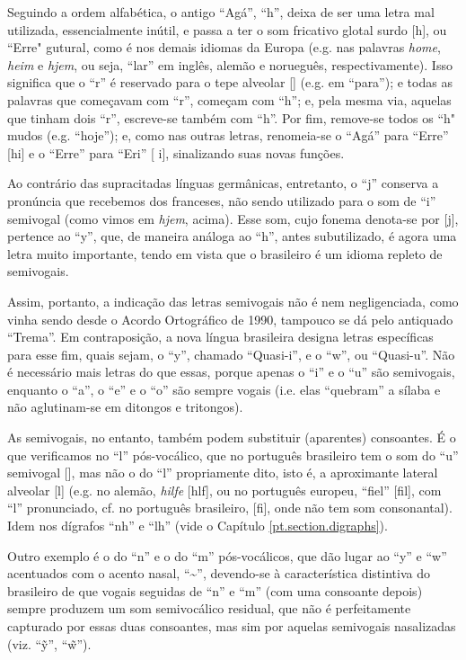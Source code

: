 \documentclass[12pt, a5paper, titlepage]{article}
\begin{document}
Seguindo a ordem alfabética, o antigo ``Agá'', ``h'', deixa de ser uma letra
mal utilizada, essencialmente inútil, e passa a ter o som fricativo glotal
surdo [h], ou ``Erre" gutural, como é nos demais idiomas da Europa (e.g. nas
palavras \textit{home}, \textit{heim} e \textit{hjem}, ou seja, ``lar'' em
inglês, alemão e norueguês, respectivamente). Isso significa que o ``r'' é
reservado para o tepe alveolar [\textfishhookr] (e.g. em ``para''); e todas as
palavras que começavam com ``r'', começam com ``h''; e, pela mesma via, aquelas
que tinham dois ``r'', escreve-se também com ``h''. Por fim, remove-se todos os
``h" mudos (e.g. ``hoje''); e, como nas outras letras, renomeia-se o ``Agá''
para ``Erre'' [\textepsilon hi] e o ``Erre'' para ``Eri'' [\textepsilon
\textfishhookr i], sinalizando suas novas funções.

Ao contrário das supracitadas línguas germânicas, entretanto, o ``j'' conserva
a pronúncia que recebemos dos franceses, não sendo utilizado para o som de
``i'' semivogal (como vimos em \textit{hjem}, acima). Esse som, cujo fonema
denota-se por [j], pertence ao ``y'', que, de maneira análoga ao ``h'', antes
subutilizado, é agora uma letra muito importante, tendo em vista que o
brasileiro é um idioma repleto de semivogais.

Assim, portanto, a indicação das letras semivogais não é nem negligenciada,
como vinha sendo desde o Acordo Ortográfico de 1990, tampouco se dá pelo
antiquado ``Trema''. Em contraposição, a nova língua brasileira designa letras
específicas para esse fim, quais sejam, o ``y'', chamado ``Quasi-i'', e o
``w'', ou ``Quasi-u''. Não é necessário mais letras do que essas, porque apenas
o ``i'' e o ``u'' são semivogais, enquanto o ``a'', o ``e'' e o ``o'' são
sempre vogais (i.e. elas ``quebram'' a sílaba e não aglutinam-se em ditongos e
tritongos).

As semivogais, no entanto, também podem substituir (aparentes) consoantes. É o que verificamos no ``l'' pós-vocálico, que no português brasileiro tem o som do ``u'' semivogal [], mas não o do ``l'' propriamente dito, isto é, a aproximante lateral alveolar [l] (e.g. no alemão, \textit{hilfe} [\textprimstress h\textsci lf\textschwa], ou no português europeu, ``fiel'' [fi\textprimstress\textepsilon l], com ``l'' pronunciado, cf. no português brasileiro, [fi\textprimstress {}], onde não tem som consonantal). Idem nos dígrafos ``nh'' e ``lh'' (vide o Capítulo \ref{pt.section.digraphs}).

Outro exemplo é o do ``n'' e o do ``m'' pós-vocálicos, que dão lugar ao ``y'' e ``w'' acentuados com o acento nasal, ``\textasciitilde'', devendo-se à característica distintiva do brasileiro de que vogais seguidas de ``n'' e ``m'' (com uma consoante depois) sempre produzem um som semivocálico residual, que não é perfeitamente capturado por essas duas consoantes, mas sim por aquelas semivogais nasalizadas (viz. ``\~y'', ``\~w'').
\end{document}
